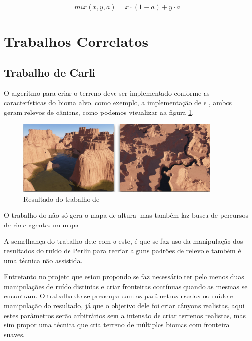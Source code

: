 \begin{equation}\label{eq:mixfunc}
  \begin{split}
    mix(x, y, a) = x \cdot (1 - a) + y \cdot a
  \end{split}
\end{equation}

\section{Trabalhos Correlatos}
\subsection{Trabalho de Carli}
O algoritmo para criar o terreno deve ser implementado conforme as
características do bioma alvo, como exemplo, a implementação de 
\cite{gabrielle2016canion} e \cite{carli2012canion}, ambos geram relevos de
cânions, como podemos visualizar na figura \ref{fig:carli2012result}.
\begin{figure}[H]
    \centering
    \includegraphics[width=0.9\textwidth]{figuras/carli2012result.png}
    \caption{Resultado do trabalho de \cite{carli2012canion}}
    \label{fig:carli2012result}
\end{figure}

O trabalho do \cite{carli2012canion} não só gera o mapa de altura, mas também
faz busca de percursos de rio e agentes no mapa.

A semelhança do 
trabalho dele com o este, é que se faz uso da manipulação dos resultados do ruído
de Perlin para recriar alguns padrões de relevo e também é uma técnica não assistida.


Entretanto no projeto que 
estou propondo se faz necessário ter pelo menos duas manipulações de ruído distintas
e criar fronteiras contínuas quando as mesmas se encontram. O trabalho 
do \cite{carli2012canion} se preocupa com os parâmetros usados no ruído e manipulação do
resultado, já que o objetivo dele foi criar cânyons realistas, aqui estes parâmetros serão arbitrários
sem a intensão de criar terrenos realistas, mas sim propor uma técnica que cria terreno de múltiplos biomas com fronteira suaves.

